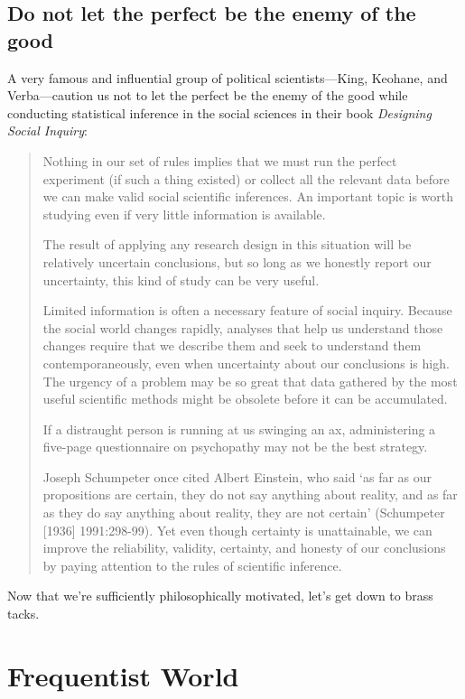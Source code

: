 \documentclass[]{article}
\begin{document}
\newpage

\subsection{Do not let the perfect be the enemy of the good}

A very famous and influential group of political scientists---King, Keohane, and Verba---caution us not to let the perfect be the enemy of the good while conducting statistical inference in the social sciences in their book \emph{Designing Social Inquiry}:

\begin{quote}
Nothing in our set of rules implies that we must run the perfect experiment (if such a thing existed) or collect all the relevant data before we can make valid social scientific inferences. An important topic is worth studying even if very little information is available.

The result of applying any research design in this situation will be relatively uncertain conclusions, but so long as we honestly report our uncertainty, this kind of study can be very useful. 

Limited information is often a necessary feature of social inquiry. Because the social world changes rapidly, analyses that help us understand those changes require that we describe them and seek to understand them contemporaneously, even when uncertainty about our conclusions is high. The urgency of a problem may be so great that data gathered by the most useful scientific methods might be obsolete before it can be accumulated. 

If a distraught person is running at us swinging an ax, administering a five-page questionnaire on psychopathy may not be the best strategy. 

Joseph Schumpeter once cited Albert Einstein, who said `as far as our propositions are certain, they do not say anything about reality, and as far as they do say anything about reality, they are not certain' (Schumpeter {[}1936{]} 1991:298-99). Yet even though certainty is unattainable, we can improve the reliability, validity, certainty, and honesty of our conclusions by paying attention to the rules of scientific inference.
\end{quote}

Now that we're sufficiently philosophically motivated, let's get down to
brass tacks.

\newpage

\section{Frequentist World}
\end{document}
